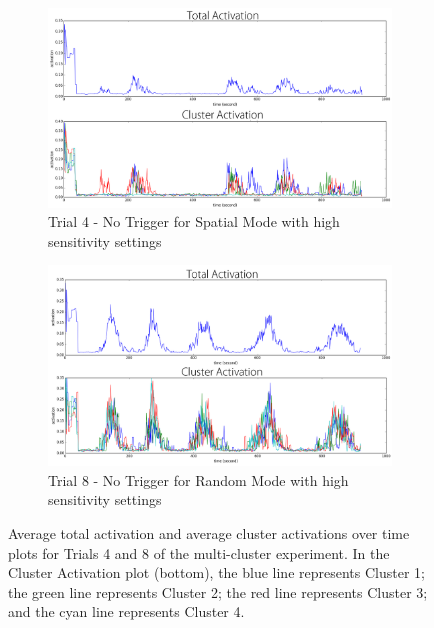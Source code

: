 \begin{figure}[!htbp]
	\centering
	\begin{subfigure}[t]{0.8\textwidth}
		\centering
		\includegraphics[width=1.0 \textwidth]{"fig/validations/multicluster trial 4"}
		\caption{Trial 4 - No Trigger for Spatial Mode with high sensitivity settings}
		\label{fig:multicluster trial 4}
	\end{subfigure}
	
	\begin{subfigure}[t]{0.8\textwidth}
		\centering
		\includegraphics[width=1.0 \textwidth]{"fig/validations/multicluster trial 8"}
		\caption{Trial 8 - No Trigger for Random Mode with high sensitivity settings}
		\label{fig:multicluster trial 8}
	\end{subfigure}
	\caption[Average total activation and average cluster activations over time plots for Trials 4 and 8 of the multi-cluster experiment]{Average total activation and average cluster activations over time plots for Trials 4 and 8 of the multi-cluster experiment. In the Cluster Activation plot (bottom), the blue line represents Cluster 1; the green line represents Cluster 2; the red line represents Cluster 3; and the cyan line represents Cluster 4.}
	\label{fig:multicluster 4-8}
\end{figure}


